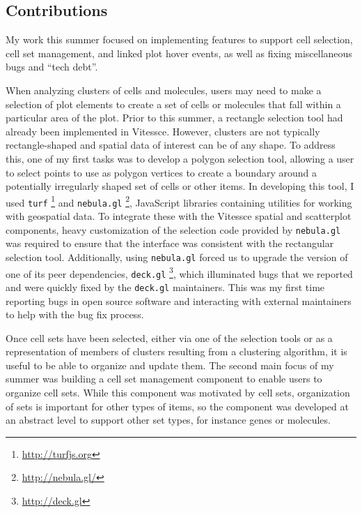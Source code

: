 \documentclass[12pt, letterpaper]{article}
\begin{document}
\subsection{Contributions}
My work this summer focused on implementing features to support cell selection, cell set management, and linked plot hover events, as well as fixing miscellaneous bugs and ``tech debt''.

When analyzing clusters of cells and molecules, users may need to make a selection of plot elements to create a set of cells or molecules that fall within a particular area of the plot.
Prior to this summer, a rectangle selection tool had already been implemented in Vitessce.
However, clusters are not typically rectangle-shaped and spatial data of interest can be of any shape.
To address this, one of my first tasks was to develop a polygon selection tool, allowing a user to select points to use as polygon vertices to create a boundary around a potentially irregularly shaped set of cells or other items.
In developing this tool, I used \texttt{turf} \footnote{\url{http://turfjs.org}} and \texttt{nebula.gl} \footnote{\url{http://nebula.gl/}}, JavaScript libraries containing utilities for working with geospatial data.
To integrate these with the Vitessce spatial and scatterplot components, heavy customization of the selection code provided by \texttt{nebula.gl} was required to ensure that the interface was consistent with the rectangular selection tool.
Additionally, using \texttt{nebula.gl} forced us to upgrade the version of one of its peer dependencies, \texttt{deck.gl} \footnote{\url{http://deck.gl}}, which illuminated bugs that we reported and were quickly fixed by the \texttt{deck.gl} maintainers.
This was my first time reporting bugs in open source software and interacting with external maintainers to help with the bug fix process.

Once cell sets have been selected, either via one of the selection tools or as a representation of members of clusters resulting from a clustering algorithm, it is useful to be able to organize and update them.
The second main focus of my summer was building a cell set management component to enable users to organize cell sets.
While this component was motivated by cell sets, organization of sets is important for other types of items, so the component was developed at an abstract level to support other set types, for instance genes or molecules.
\end{document}
